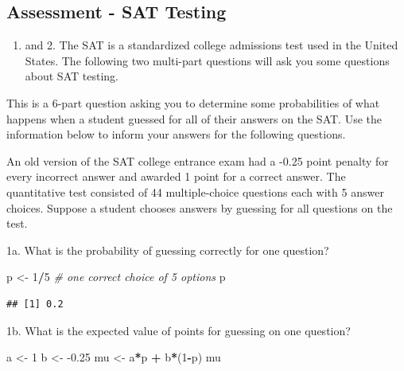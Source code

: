 \documentclass[
]{article}
\newenvironment{Shaded}{\begin{snugshade}}{\end{snugshade}}
\newcommand{\CommentTok}[1]{\textcolor[rgb]{0.56,0.35,0.01}{\textit{#1}}}
\newcommand{\DecValTok}[1]{\textcolor[rgb]{0.00,0.00,0.81}{#1}}
\newcommand{\FloatTok}[1]{\textcolor[rgb]{0.00,0.00,0.81}{#1}}
\newcommand{\NormalTok}[1]{#1}
\newcommand{\OperatorTok}[1]{\textcolor[rgb]{0.81,0.36,0.00}{\textbf{#1}}}
\newcommand{\StringTok}[1]{\textcolor[rgb]{0.31,0.60,0.02}{#1}}
\providecommand{\tightlist}{%
  \setlength{\itemsep}{0pt}\setlength{\parskip}{0pt}}
\begin{document}
\hypertarget{assessment---sat-testing}{%
\subsection{Assessment - SAT Testing}\label{assessment---sat-testing}}

\begin{enumerate}
\def\labelenumi{\arabic{enumi}.}
\tightlist
\item
  and 2. The SAT is a standardized college admissions test used in the
  United States. The following two multi-part questions will ask you
  some questions about SAT testing.
\end{enumerate}

This is a 6-part question asking you to determine some probabilities of
what happens when a student guessed for all of their answers on the SAT.
Use the information below to inform your answers for the following
questions.

An old version of the SAT college entrance exam had a -0.25 point
penalty for every incorrect answer and awarded 1 point for a correct
answer. The quantitative test consisted of 44 multiple-choice questions
each with 5 answer choices. Suppose a student chooses answers by
guessing for all questions on the test.

1a. What is the probability of guessing correctly for one question?

\begin{Shaded}
\begin{Highlighting}[]
\NormalTok{p \textless{}{-}}\StringTok{ }\DecValTok{1}\OperatorTok{/}\DecValTok{5} \CommentTok{\# one correct choice of 5 options}
\NormalTok{p}
\end{Highlighting}
\end{Shaded}

\begin{verbatim}
## [1] 0.2
\end{verbatim}

1b. What is the expected value of points for guessing on one question?

\begin{Shaded}
\begin{Highlighting}[]
\NormalTok{a \textless{}{-}}\StringTok{ }\DecValTok{1}
\NormalTok{b \textless{}{-}}\StringTok{ }\FloatTok{{-}0.25}
\NormalTok{mu \textless{}{-}}\StringTok{ }\NormalTok{a}\OperatorTok{*}\NormalTok{p }\OperatorTok{+}\StringTok{ }\NormalTok{b}\OperatorTok{*}\NormalTok{(}\DecValTok{1}\OperatorTok{{-}}\NormalTok{p)}
\NormalTok{mu}
\end{Highlighting}
\end{Shaded}
\end{document}
